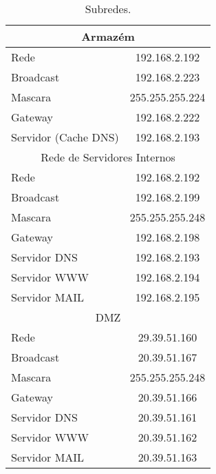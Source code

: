 \documentclass[a4paper,12pt]{article}
\begin{document}
\begin{table}[ht]
\begin{tabular}{ l | c }
      \multicolumn{2}{c}{Armazém} \\\hline 
      Rede & 192.168.2.192 \\\hline 
      Broadcast & 192.168.2.223 \\\hline 
      Mascara & 255.255.255.224 \\\hline
      Gateway & 192.168.2.222 \\\hline
      Servidor (Cache DNS) & 192.168.2.193 \\\hline
      \multicolumn{2}{c}{Rede de Servidores Internos} \\\hline 
      Rede & 192.168.2.192 \\\hline 
      Broadcast & 192.168.2.199 \\\hline 
      Mascara & 255.255.255.248 \\\hline
      Gateway & 192.168.2.198 \\\hline
      Servidor DNS & 192.168.2.193 \\\hline
      Servidor WWW & 192.168.2.194 \\\hline
      Servidor MAIL & 192.168.2.195 \\\hline

      \multicolumn{2}{c}{DMZ} \\\hline 
      Rede & 29.39.51.160 \\\hline 
      Broadcast & 20.39.51.167 \\\hline 
      Mascara & 255.255.255.248 \\\hline
      Gateway & 20.39.51.166 \\\hline
      Servidor DNS & 20.39.51.161 \\\hline
      Servidor WWW & 20.39.51.162 \\\hline
      Servidor MAIL & 20.39.51.163 \\\hline
      \bottomrule
   \end{tabular}
   \caption{Subredes.}
   \label{tab:subredes}
\end{table}
\end{document}
